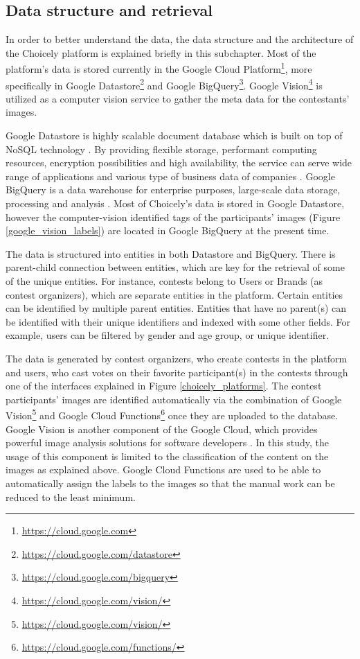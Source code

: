 \subsection{Data structure and retrieval}
    In order to better understand the data, the data structure and the architecture of the Choicely platform is explained briefly in this subchapter. Most of the platform's data is stored currently in the Google Cloud Platform\footnote{\url{https://cloud.google.com}}, more specifically in Google Datastore\footnote{\url{https://cloud.google.com/datastore}} and Google BigQuery\footnote{\url{https://cloud.google.com/bigquery}}. Google Vision\footnote{\url{https://cloud.google.com/vision/}} is utilized as a computer vision service to gather the meta data for the contestants' images. 
    
    Google Datastore is highly scalable document database which is built on top of NoSQL technology \cite{google-datastore-overview}. By providing flexible storage, performant computing resources, encryption possibilities and high availability, the service can serve wide range of applications and various type of business data of companies \cite{google-datastore-overview}. Google BigQuery is a data warehouse for enterprise purposes, large-scale data storage, processing and analysis \cite{google-bigquery-overview}. Most of Choicely's data is stored in Google Datastore, however the computer-vision identified tags of the participants' images (Figure \ref{google_vision_labels}) are located in Google BigQuery at the present time.
    
    The data is structured into entities in both Datastore and BigQuery. There is parent-child connection between entities, which are key for the retrieval of some of the unique entities. For instance, contests belong to Users or Brands (as contest organizers), which are separate entities in the platform. Certain entities can be identified by multiple parent entities. Entities that have no parent(s) can be identified with their unique identifiers and indexed with some other fields. For example, users can be filtered by gender and age group, or unique identifier. 
    
    The data is generated by contest organizers, who create contests in the platform and users, who cast votes on their favorite participant(s) in the contests through one of the interfaces explained in Figure \ref{choicely_platforms}. The contest participants' images are identified automatically via the combination of Google Vision\footnote{\url{https://cloud.google.com/vision/}} and Google Cloud Functions\footnote{\url{https://cloud.google.com/functions/}} once they are uploaded to the database. Google Vision is another component of the Google Cloud, which provides powerful image analysis solutions for software developers \cite{google-vision-overview}. In this study, the usage of this component is limited to the classification of the content on the images as explained above. Google Cloud Functions are used to be able to automatically assign the labels to the images so that the manual work can be reduced to the least minimum. 

